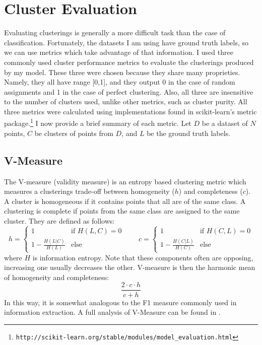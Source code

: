 \section{Cluster Evaluation}
Evaluating clusterings is generally a more difficult task than the case of classification. Fortunately, the datasets I am using have ground truth labels, so we can use metrics which take advantage of that information. I used three commonly used cluster performance metrics to evaluate the clusterings produced by my model. These three were chosen because they share many proprieties. Namely, they all have range [0,1], and they output 0 in the case of random assignments and 1 in the case of perfect clustering. Also, all three are insensitive to the number of clusters used, unlike other metrics, such as cluster purity. All three metrics were calculated using implementations found in scikit-learn's metric package.\footnote{\texttt{http://scikit-learn.org/stable/modules/model\_evaluation.html}} I now provide a brief summary of each metric. Let $D$ be a dataset of $N$ points, $C$ be clusters of points from $D$, and $L$ be the ground truth labels.

\subsection{V-Measure}
The V-measure (validity measure) is an entropy based clustering metric which measures a clusterings trade-off between homogeneity ($h$) and completeness ($c$). A cluster is homogeneous if it contains points that all are of the same class. A clustering is complete if points from the same class are assigned to the same cluster. They are defined as follows:
\begin{equation}
h =
\begin{cases}
1 & \text{if } H(L, C) = 0 \\
1 - \frac{H(L|C)}{H(L)} & \text{else}
\end{cases}
\qquad 
c =
\begin{cases}
1 & \text{if } H(C, L) = 0 \\
1 - \frac{H(C|L)}{H(C)} & \text{else}
\end{cases}
\end{equation}  
where $H$  is information entropy. Note that these components often are opposing, increasing one usually decreases the other.  V-measure is then the harmonic mean of homogeneity and completeness:
\begin{equation}
\frac{2 \cdot c \cdot h}{c+h}
\end{equation}
In this way, it is somewhat analogous to the F1 measure commonly used in information extraction. A full analysis of V-Measure can be found in \cite{vmeasure}.


